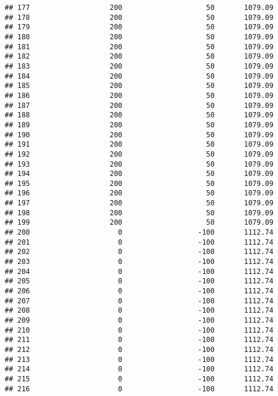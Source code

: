 \documentclass[]{article}
\begin{document}
\begin{verbatim}
## 177                   200                    50       1079.09
## 178                   200                    50       1079.09
## 179                   200                    50       1079.09
## 180                   200                    50       1079.09
## 181                   200                    50       1079.09
## 182                   200                    50       1079.09
## 183                   200                    50       1079.09
## 184                   200                    50       1079.09
## 185                   200                    50       1079.09
## 186                   200                    50       1079.09
## 187                   200                    50       1079.09
## 188                   200                    50       1079.09
## 189                   200                    50       1079.09
## 190                   200                    50       1079.09
## 191                   200                    50       1079.09
## 192                   200                    50       1079.09
## 193                   200                    50       1079.09
## 194                   200                    50       1079.09
## 195                   200                    50       1079.09
## 196                   200                    50       1079.09
## 197                   200                    50       1079.09
## 198                   200                    50       1079.09
## 199                   200                    50       1079.09
## 200                     0                  -100       1112.74
## 201                     0                  -100       1112.74
## 202                     0                  -100       1112.74
## 203                     0                  -100       1112.74
## 204                     0                  -100       1112.74
## 205                     0                  -100       1112.74
## 206                     0                  -100       1112.74
## 207                     0                  -100       1112.74
## 208                     0                  -100       1112.74
## 209                     0                  -100       1112.74
## 210                     0                  -100       1112.74
## 211                     0                  -100       1112.74
## 212                     0                  -100       1112.74
## 213                     0                  -100       1112.74
## 214                     0                  -100       1112.74
## 215                     0                  -100       1112.74
## 216                     0                  -100       1112.74

\end{verbatim}
\end{document}
